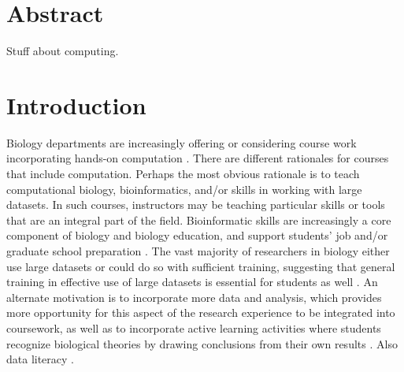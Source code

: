 \section{Abstract}\label{sect:Abstract}

Stuff about computing.

\bigskip


\bigskip
\section{Introduction}\label{sect:Introduction}

Biology departments are increasingly offering or considering course work incorporating hands-on computation
\citep{WilsonSayres18}. 
There are different rationales for courses that include computation.
Perhaps the most obvious rationale is to teach computational biology, bioinformatics,
and/or skills in working with large datasets.
In such courses, instructors may be teaching particular skills or tools that are an integral part of the field.
Bioinformatic skills are increasingly a core component of biology and biology education, and 
support students' job and/or graduate school preparation \citep{WilsonSayres18}.
The vast majority of researchers in biology either use large datasets or could do so with sufficient training, suggesting that general training in effective use of large datasets is essential for students as well \citep{Barone17,Loman13}.
An alternate motivation is to incorporate more data and analysis,
which provides more opportunity for this aspect of the research experience to be
integrated into coursework, as well as to incorporate active learning activities where
students recognize biological theories by drawing conclusions from their own results
\citep{Kjelvik19}.
Also data literacy \citep{Gibson18}.

